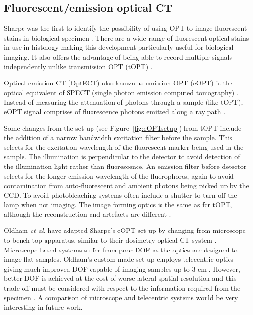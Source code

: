 	
	\subsection{Fluorescent/emission  optical CT}
	\label{subsec:eOPT}
	
	Sharpe was the first to identify the possibility of using OPT to image fluorescent stains in biological specimen \cite{Sharpe:2002jp}. There are a wide range of fluorescent optical stains in use in histology making this development particularly useful for biological imaging. It also offers the advantage of being able to record multiple signals independently unlike  transmission OPT (tOPT) \cite{Sharpe:2002jp}. 
	
	
	Optical emission CT (OptECT) also known as emission OPT (eOPT) is the optical equivalent of SPECT (single photon emission computed tomography) \cite{Oldham:2007ku}.  Instead of measuring the attenuation of photons through a sample (like tOPT), eOPT signal comprises of fluorescence photons emitted along a ray path \cite{Walls:2005ja}.
	
	
	
	Some changes from the set-up (see Figure~\ref{fig:eOPTsetup}) from tOPT  include the addition of a narrow bandwidth excitation filter before the sample. This selects for the excitation wavelength of the fluorescent marker being used in the sample. The illumination is perpendicular to the detector to avoid detection of the illumination light rather than fluorescence. An emission filter before detector selects for the longer emission wavelength of the fluorophores, again to avoid contamination from auto-fluorescent and ambient photons being picked up by the CCD. To avoid photobleaching systems often include a shutter to turn off the lamp when not imaging.  The image forming optics is the same as for tOPT, although the reconstruction and artefacts are different \cite{Walls:2005ja}.
	
	
	
	Oldham \textit{et al.} have adapted Sharpe's eOPT set-up by changing from microscope to bench-top apparatus, similar to their dosimetry optical CT system \cite{Oldham:2006, Oldham:2007ku}. Microscope based systems suffer from poor DOF as the optics are designed to image flat samples.  Oldham's custom made set-up employs telecentric optics giving much improved DOF capable of imaging samples up to 3 cm \cite{Oldham:2007ku}. However, better DOF is achieved at the cost of worse lateral spatial resolution and this trade-off must be considered with respect to the information required from the specimen \cite{Krstajic:2006kna}.   A comparison of microscope and telecentric systems would be very interesting in future work.
	
